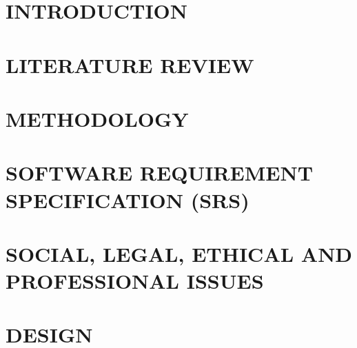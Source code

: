 \documentclass[12pt,a4paper,oneside]{report}
\begin{document}
\pagestyle{empty}

\cleardoublepage

\pagestyle{fancy}
\setcounter{page}{1}


\cleardoublepage

\cleardoublepage

\cleardoublepage
\tableofcontents
\newpage
\listoffigures
\newpage
\listoftables
\newpage


\cleardoublepage
{}
\setcounter{page}{1}

\chapter{INTRODUCTION}
\renewcommand{\currentchapter}{INTRODUCTION}


\chapter{LITERATURE REVIEW}
\renewcommand{\currentchapter}{LITERATURE REVIEW}


\chapter{METHODOLOGY}
\renewcommand{\currentchapter}{METHODOLOGY}


\chapter{SOFTWARE REQUIREMENT SPECIFICATION (SRS)}
\renewcommand{\currentchapter}{SOFTWARE REQUIREMENT SPECIFICATION (SRS)}


\chapter{SOCIAL, LEGAL, ETHICAL AND PROFESSIONAL ISSUES}
\renewcommand{\currentchapter}{SOCIAL, LEGAL, ETHICAL AND PROFESSIONAL ISSUES}


\chapter{DESIGN}
\renewcommand{\currentchapter}{DESIGN}

\end{document}
